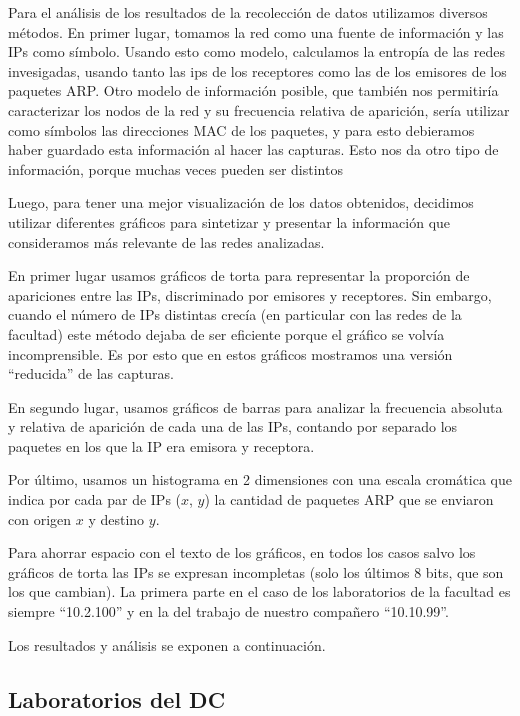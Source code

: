 Para el análisis de los resultados de la recolección de datos utilizamos
diversos métodos. En primer lugar, tomamos la red como una fuente de
información y las IPs como símbolo. Usando esto como modelo, calculamos la
entropía de las redes invesigadas, usando tanto las ips de los receptores como
las de los emisores de los paquetes ARP. Otro modelo de información posible,
que también nos permitiría caracterizar los nodos de la red y su frecuencia
relativa de aparición, sería utilizar como símbolos las direcciones MAC de los
paquetes, y para esto debieramos haber guardado esta información al hacer las capturas. Esto nos da otro tipo de información, porque muchas veces pueden ser
distintos 

Luego, para tener una mejor visualización de los datos obtenidos, decidimos
utilizar diferentes gráficos para sintetizar y presentar la información que
consideramos más relevante de las redes analizadas.

En primer lugar usamos gráficos de torta para representar la proporción de
apariciones entre las IPs, discriminado por emisores y receptores. Sin embargo,
cuando el número de IPs distintas crecía (en particular con las redes de la
facultad) este método dejaba de ser eficiente porque el gráfico se volvía
incomprensible. Es por esto que en estos gráficos mostramos una versión
``reducida'' de las capturas.

En segundo lugar, usamos gráficos de barras para analizar la frecuencia
absoluta y relativa de aparición de cada una de las IPs, contando por separado
los paquetes en los que la IP era emisora y receptora.

Por último, usamos un histograma en 2 dimensiones con una escala cromática
que indica por cada par de IPs ($x$, $y$) la cantidad de paquetes ARP que se enviaron con origen $x$ y destino $y$.

Para ahorrar espacio con el texto de los gráficos, en todos los casos salvo los
gráficos de torta las IPs se expresan incompletas (solo los últimos 8 bits, que
son los que cambian). La primera parte en el caso de los laboratorios de la
facultad es siempre ``10.2.100'' y en la del trabajo de nuestro compañero
``10.10.99''.

Los resultados y análisis se exponen a continuación.

\subsection{Laboratorios del DC}

